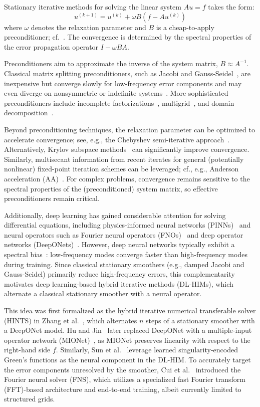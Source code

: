 \documentclass[11pt]{article}
\begin{document}
Stationary iterative methods for solving the linear system $Au=f$ takes the form:
$$
    u^{(k+1)} = u^{(k)} + \omega B(f - Au^{(k)})
$$
where $\omega$ denotes the relaxation parameter and $B$ is a cheap-to-apply preconditioner; cf.~\cite{van2003iterative}. The convergence is determined by the spectral properties of the error propagation operator $I - \omega BA$.

Preconditioners aim to approximate the inverse of the system matrix, $B\approx A^{-1}$. Classical matrix splitting preconditioners, such as Jacobi and Gauss-Seidel~\cite{van2003iterative}, are inexpensive but converge slowly for low-frequency error components and may even diverge on nonsymmetric or indefinite systems~\cite{van2003iterative}. More sophisticated preconditioners include incomplete factorizations~\cite{benzi2002preconditioning}, multigrid~\cite{trottenberg_multigrid_2000}, and domain decomposition~\cite{dolean2015introduction}.

Beyond preconditioning techniques, the relaxation parameter can be optimized to accelerate convergence; see, e.g., the Chebyshev semi-iterative approach~\cite{golub1961chebyshev}. Alternatively, Krylov subspace methods~\cite{van2003iterative} can significantly improve convergence. Similarly, multisecant information from recent iterates for general (potentially nonlinear) fixed-point iteration schemes can be leveraged; cf., e.g., Anderson acceleration (AA)~\cite{walker2011anderson}. For complex problems, convergence remains sensitive to the spectral properties of the (preconditioned) system matrix, so effective preconditioners remain critical.

Additionally, deep learning has gained considerable attention for solving differential equations, including physics-informed neural networks (PINNs)~\cite{raissi2019physics} and neural operators such as Fourier neural operators (FNOs)~\cite{li2020fourier} and deep operator networks (DeepONets)~\cite{lu2021deeponet}. However, deep neural networks typically exhibit a spectral bias~\cite{rahaman_spectral_2019}: low-frequency modes converge faster than high-frequency modes during training. Since classical stationary smoothers (e.g., damped Jacobi and Gauss-Seidel) primarily reduce high-frequency errors, this complementarity motivates deep learning-based hybrid iterative methods (DL-HIMs), which alternate a classical stationary smoother with a neural operator.

This idea was first formalized as the hybrid iterative numerical transferable solver (HINTS) in Zhang et al.~\cite{zhang2024blending}, which alternates $n$ steps of a stationary smoother with a DeepONet model. Hu and Jin~\cite{hu2025hybrid} later replaced DeepONet with a multiple-input operator network (MIONet)~\cite{jin2022mionet}, as MIONet preserves linearity with respect to the right-hand side $f$. Similarly, Sun et al.~\cite{sun2025learning} leverage learned singularity-encoded Green's functions as the neural component in the DL-HIM. To accurately target the error components unresolved by the smoother, Cui et al.~\cite{cui2025hybrid} introduced the Fourier neural solver (FNS), which utilizes a specialized fast Fourier transform (FFT)-based architecture and end-to-end training, albeit currently limited to structured grids.
\end{document}
